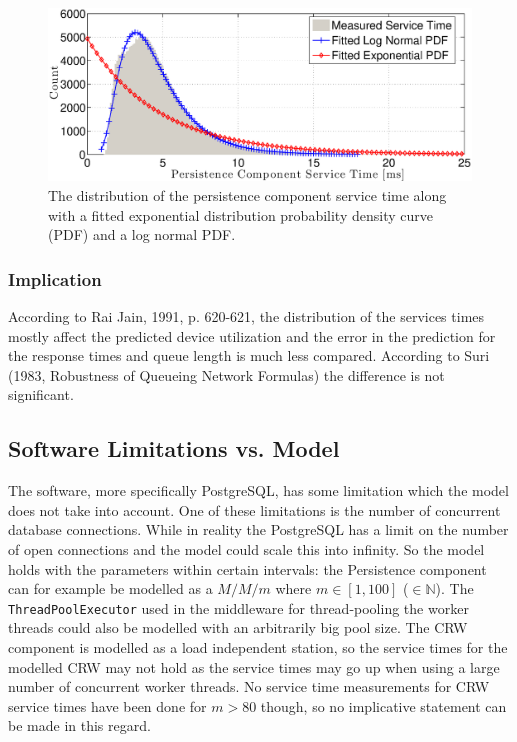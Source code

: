 \documentclass[a4paper, 11pt]{article}
\begin{document}
		\FloatBarrier
		\begin{figure}[cht!]
			\centering
				\includegraphics[width=1\linewidth,keepaspectratio]{serviceTimeDbHistogram10Threads}
			\caption{The distribution of the persistence component service time along with a fitted exponential distribution probability density curve (PDF) and a log normal PDF.}
			\label{fig:serviceTimeDbHistogram10Threads}
		\end{figure}
		\FloatBarrier

		\subsubsection{Implication}
			According to Rai Jain, 1991, p. 620-621, the distribution of the services times mostly affect the predicted device utilization and the error in the prediction for the response times and queue length is much less compared. According to Suri (1983, Robustness of Queueing Network Formulas) the difference is not significant.

	\subsection{Software Limitations vs. Model}
		The software, more specifically PostgreSQL, has some limitation which the model does not take into account. One of these limitations is the number of concurrent database connections. While in reality the PostgreSQL has a limit on the number of open connections and the model could scale this into infinity. So the model holds with the parameters within certain intervals: the Persistence component can for example be modelled as a $M/M/m$ where $m \in [1,100]$ ($\in \mathbb{N}$). The \texttt{ThreadPoolExecutor} used in the middleware for thread-pooling the worker threads could also be modelled with an arbitrarily big pool size. The CRW component is modelled as a load independent station, so the service times for the modelled CRW may not hold as the service times may go up when using a large number of concurrent worker threads. No service time measurements for CRW service times have been done for $m > 80$ though, so no implicative statement can be made in this regard.
\end{document}
